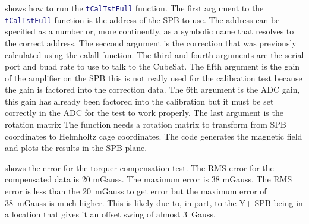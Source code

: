  shows how to run the \lstinline[style=code,language=Matlab]$tCalTstFull$ function. The first argument to the \lstinline[style=code,language=Matlab]$tCalTstFull$ function is the address of the \ac{SPB} to use. The address can be specified as a number or, more continently, as a symbolic name that resolves to the correct address. The seccond argument is the correction that was previously calculated using the calall function. The third and fourth arguments are the serial port and buad rate to use to talk to the CubeSat. The fifth argument is the gain of the amplifier on the \ac{SPB} this is not really used for the calibration test because the gain is factored into the correction data. The 6th argument is the \ac{ADC} gain, this gain has already been factored into the calibration but it must be set correctly in the \ac{ADC} for the test to work properly. The last argument is the rotation matrix  The function needs a rotation matrix to transform from \ac{SPB} coordinates to Helmholtz cage coordinates. The code generates the magnetic field and plots the results in the \ac{SPB} plane.


 shows the error for the torquer compensation test. The RMS error for the compensated data is 20 mGauss. The maximum error is 38 mGauss. The RMS error is less than the 20~mGauss to get {\textdegree} error but the maximum error of 38~mGauss is much higher. This is likely due to, in part, to the Y+ \ac{SPB} being in a location that gives it an offset swing of almost 3~Gauss.


